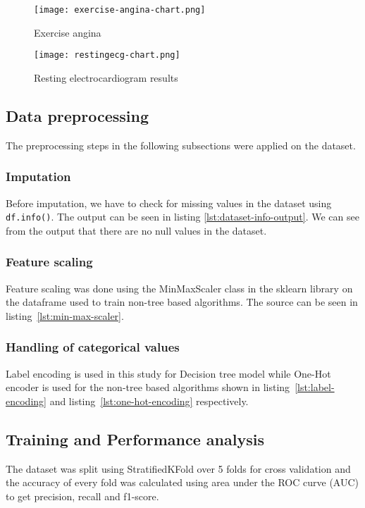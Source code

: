 \begin{figure}[htb]
	\centering
	\texttt{[image: exercise-angina-chart.png]}
	\caption{Exercise angina}
	\label{fig:exercise-angina-chart}
\end{figure}

\begin{figure}[htb]
	\centering
	\texttt{[image: restingecg-chart.png]}
	\caption{Resting electrocardiogram results}
	\label{fig:restingect-chart}
\end{figure}

\subsection{Data preprocessing}
The preprocessing steps in the following subsections were applied on the dataset.
\subsubsection{Imputation}
Before imputation, we have to check for missing values in the dataset using \lstinline[language=Python,columns=fixed]|df.info()|. The output can be seen in listing \ref{lst:dataset-info-output}. We can see from the output that there are no null values in the dataset.


\subsubsection{Feature scaling}
Feature scaling was done using the MinMaxScaler class in the sklearn library on the dataframe used to train non-tree based algorithms. The source can be seen in listing~\ref{lst:min-max-scaler}.


\subsubsection{Handling of categorical values}
Label encoding is used in this study for Decision tree model while One-Hot encoder is used for the non-tree based algorithms shown in listing~\ref{lst:label-encoding} and listing~\ref{lst:one-hot-encoding} respectively.




\subsection{Training and Performance analysis}
The dataset was split using StratifiedKFold over 5 folds for cross validation and the accuracy of every fold was calculated using area under the ROC curve (AUC) to get precision, recall and f1-score.


